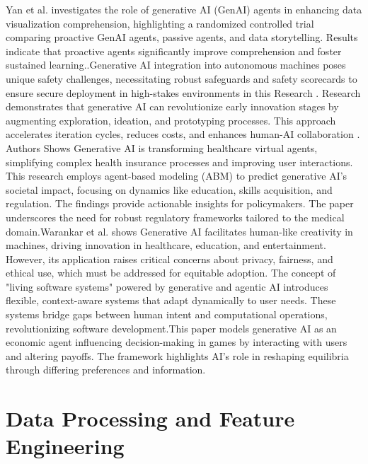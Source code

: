 \documentclass[conference]{IEEEtran}
\begin{document}
Yan et al. investigates the role of generative AI (GenAI) agents in enhancing data visualization comprehension, highlighting a randomized controlled trial comparing proactive GenAI agents, passive agents, and data storytelling. Results indicate that proactive agents significantly improve comprehension and foster sustained learning.\cite{b1}.Generative AI integration into autonomous machines poses unique safety challenges, necessitating robust safeguards and safety scorecards to ensure secure deployment in high-stakes environments in this Research \cite{b2}.\cite{b3} Research demonstrates that generative AI can revolutionize early innovation stages by augmenting exploration, ideation, and prototyping processes. This approach accelerates iteration cycles, reduces costs, and enhances human-AI collaboration .\cite{b4} Authors Shows Generative AI is transforming healthcare virtual agents, simplifying complex health insurance processes and improving user interactions. This research employs agent-based modeling (ABM) to predict generative AI's societal impact, focusing on dynamics like education, skills acquisition, and regulation. The findings provide actionable insights for policymakers\cite{b5}.\cite{b6} The paper underscores the need for robust regulatory frameworks tailored to the medical domain.Warankar et al. shows  Generative AI facilitates human-like creativity in machines, driving innovation in healthcare, education, and entertainment. However, its application raises critical concerns about privacy, fairness, and ethical use, which must be addressed for equitable adoption\cite{b7}.\cite{b8} The concept of "living software systems" powered by generative and agentic AI introduces flexible, context-aware systems that adapt dynamically to user needs. These systems bridge gaps between human intent and computational operations, revolutionizing software development.This paper models generative AI as an economic agent influencing decision-making in games by interacting with users and altering payoffs. The framework highlights AI's role in reshaping equilibria through differing preferences and information.\cite{b9}


\section{Data Processing and Feature Engineering}
\end{document}
